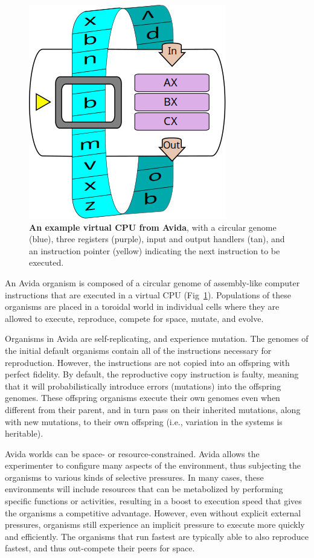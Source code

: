 \documentclass[PhD]{msu-thesis}
\begin{document}
\begin{figure}[!h]
\includegraphics[width=0.5\columnwidth]{figures/methods/squishedCPU_extra.png}
\caption{\textbf{An example virtual CPU from Avida}, with a circular genome (blue), three registers (purple), input and output handlers (tan), and an instruction pointer (yellow) indicating the next instruction to be executed.%
}\label{fig:cpu}
\end{figure}

An Avida organism is composed of a circular genome of assembly-like computer instructions that are executed in a virtual CPU (Fig~\ref{fig:cpu}). Populations of these organisms are placed in a toroidal world in individual cells where they are allowed to execute, reproduce, compete for space, mutate, and evolve.

Organisms in Avida are self-replicating, and experience mutation. The genomes of the initial default organisms contain all of the instructions necessary for reproduction. However, the instructions are not copied into an offspring with perfect fidelity. By default, the reproductive copy instruction is faulty, meaning that it will probabilistically introduce errors (mutations) into the offspring genomes. These offspring organisms execute their own genomes even when different from their parent, and in turn pass on their inherited mutations, along with new mutations, to their own offspring (i.e., variation in the systems is heritable).

Avida worlds can be space- or resource-constrained. Avida allows the experimenter to configure many aspects of the environment, thus subjecting the organisms to various kinds of selective pressures. In many cases, these environments will include resources that can be metabolized by performing specific functions or activities, resulting in a boost to execution speed that gives the organisms a competitive advantage. However, even without explicit external pressures, organisms still experience an implicit pressure to execute more quickly and efficiently. The organisms that run fastest are typically able to also reproduce fastest, and thus out-compete their peers for space.
\end{document}
